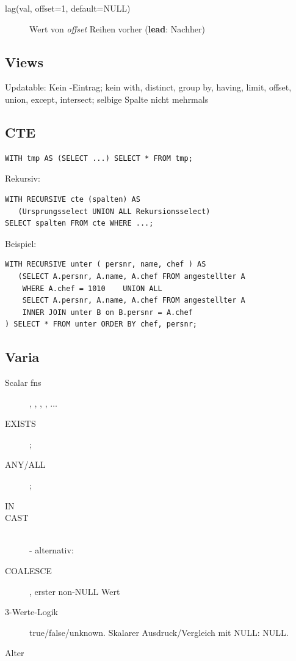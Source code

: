 \begin{multicols*}{3}
\begin{description}
  \item[lag(val, offset=1, default=NULL)]{Wert von \emph{offset} Reihen vorher
      (\textbf{lead}: Nachher)}
\end{description}

\subsection{Views}

Updatable: Kein -Eintrag; kein with, distinct, group by, having,
limit, offset, union, except, intersect; selbige Spalte nicht mehrmals

\subsection{CTE}
\begin{verbatim}
WITH tmp AS (SELECT ...) SELECT * FROM tmp;
\end{verbatim}

Rekursiv:

\begin{verbatim}
WITH RECURSIVE cte (spalten) AS
   (Ursprungsselect UNION ALL Rekursionsselect)
SELECT spalten FROM cte WHERE ...;
\end{verbatim}

Beispiel:

\begin{verbatim}
WITH RECURSIVE unter ( persnr, name, chef ) AS
   (SELECT A.persnr, A.name, A.chef FROM angestellter A
    WHERE A.chef = 1010    UNION ALL
    SELECT A.persnr, A.name, A.chef FROM angestellter A
    INNER JOIN unter B on B.persnr = A.chef
) SELECT * FROM unter ORDER BY chef, persnr;
\end{verbatim}

\subsection{Varia}

\begin{description}
\item[Scalar fns]{, , , , $\ldots$}
\item[EXISTS]{;}
\item[ANY/ALL]{;}
\item[IN]{}
\item[CAST]{ \\  - alternativ: }
\item[COALESCE]{, erster non-NULL Wert}
\item[3-Werte-Logik]{true/false/unknown. Skalarer Ausdruck/Vergleich mit NULL: NULL.}
\item[Alter]{}
\end{description}


\end{multicols*}
